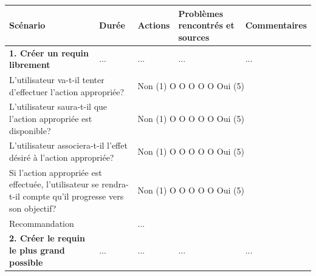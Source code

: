 \documentclass{article}
\begin{document}
\begin{table}[h]
	\centering
	\begin{tabular}{|p{6cm}|p{1.5cm}|p{1.5cm}|p{2.5cm}|p{3.5cm}|}
		\hline
		\textbf{Scénario}                                                                                                                         & \textbf{Durée}                                        & \textbf{Actions} & \textbf{Problèmes rencontrés et sources} & \textbf{Commentaires} \\ \hline
		\textbf{1. Créer un requin librement}                                                                                                     & ...                                                   & ...              & ...                                      & ...                   \\ \hline
		\multicolumn{2}{|p{7.5cm}|}{L’utilisateur va-t-il tenter d’effectuer l’action appropriée?}                                                & \multicolumn{3}{p{7.5cm}|}{Non (1) O O O O O Oui (5)}                                                                                       \\ \hline
		\multicolumn{2}{|p{7.5cm}|}{L’utilisateur saura-t-il que l’action appropriée est disponible?}                                             & \multicolumn{3}{p{7.5cm}|}{Non (1) O O O O O Oui (5)}                                                                                       \\ \hline
		\multicolumn{2}{|p{7.5cm}|}{L’utilisateur associera-t-il l’effet désiré à l’action appropriée?}                                           & \multicolumn{3}{p{7.5cm}|}{Non (1) O O O O O Oui (5)}                                                                                       \\ \hline
		\multicolumn{2}{|p{7.5cm}|}{Si l’action appropriée est effectuée, l’utilisateur se rendra-t-il compte qu’il progresse vers son objectif?} & \multicolumn{3}{p{7.5cm}|}{Non (1) O O O O O Oui (5)}                                                                                       \\ \hline
		\multicolumn{2}{|p{7.5cm}|}{Recommandation}                                                                                               & \multicolumn{3}{p{7.5cm}|}{...}                                                                                                             \\ \hline
		\textbf{2. Créer le requin le plus grand possible}                                                                                        & ...                                                   & ...              & ...                                      & ...                   \\ \hline

\end{tabular}
\end{table}
\end{document}
